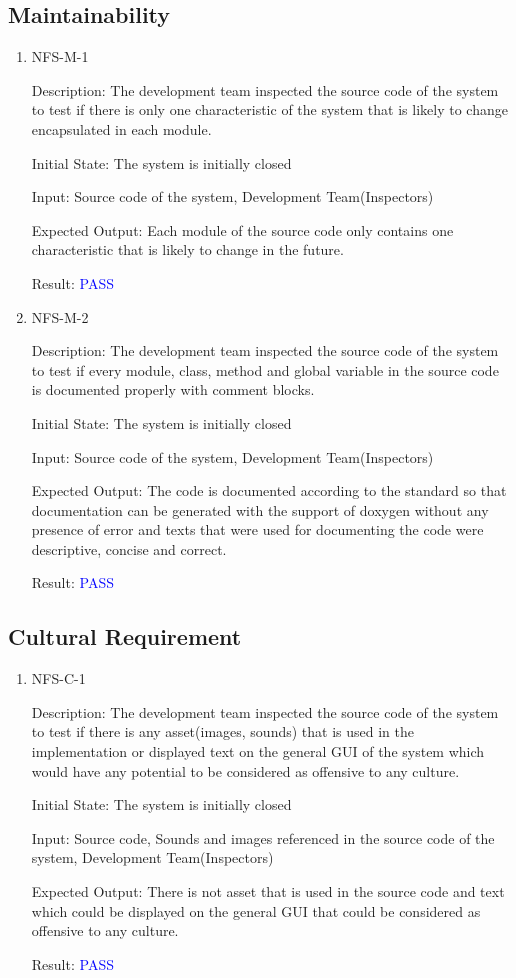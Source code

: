 \documentclass[12pt, titlepage]{article}
\begin{document}
\subsection{Maintainability}
\begin{enumerate}
\item{NFS-M-1\\}

Description: The development team inspected the source code of the system to test if there is only one characteristic of the system that is likely to change encapsulated in each module.

Initial State: The system is initially closed
                
Input: Source code of the system, Development Team(Inspectors)

Expected Output: Each module of the source code only contains one characteristic that is likely to change in the future.

Result: \textcolor{blue}{PASS}

\item{NFS-M-2\\}

Description: The development team inspected the source code of the system to test if every module, class, method and global variable in the source code is documented properly with comment blocks.

Initial State: The system is initially closed
                
Input: Source code of the system, Development Team(Inspectors)

Expected Output: The code is documented according to the standard so that documentation can be generated with the support of doxygen without any presence of error and texts that were used for documenting the code were descriptive, concise and correct.

Result: \textcolor{blue}{PASS}
\end{enumerate}

\subsection{Cultural Requirement}

\begin{enumerate}
\item{NFS-C-1\\}

Description: The development team inspected the source code of the system to test if there is any asset(images, sounds) that is used in the implementation or displayed text on the general GUI of the system which would have any potential to be considered as offensive to any culture.

Initial State: The system is initially closed

Input: Source code, Sounds and images referenced in the source code of the system, Development Team(Inspectors)

Expected Output: There is not asset that is used in the source code and text which could be displayed on the general GUI that could be considered as offensive to any culture.

Result: \textcolor{blue}{PASS}
\end{enumerate}
\end{document}
